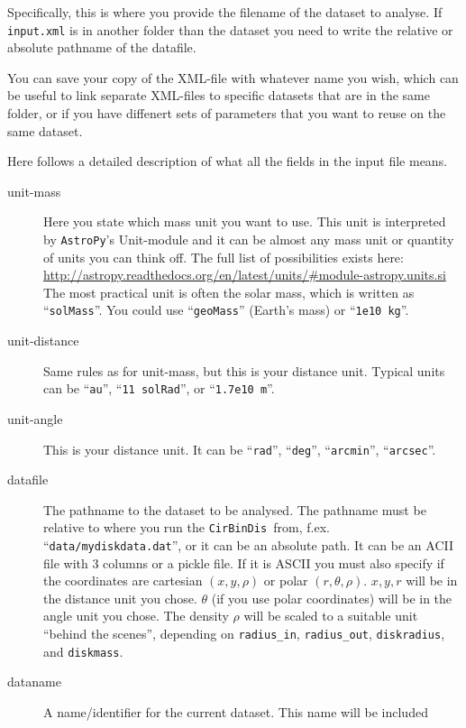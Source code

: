 \documentclass[a4paper, 12pt, english, titlepage]{article}
\newcommand{\sname}{\texttt{CirBinDis }}
\begin{document}
    Specifically, this is where you provide the filename of the dataset to analyse.
    If \texttt{input.xml} is in another folder than the dataset you need to write the relative or absolute pathname of the datafile.

    You can save your copy of the XML-file with whatever name you wish, which can be useful to link separate XML-files to specific datasets that are in the same folder, or if you have diffenert sets of parameters that you want to reuse on the same dataset.

    Here follows a detailed description of what all the fields in the input file means.

    \begin{description}
        \item[unit-mass]
            Here you state which mass unit you want to use. This unit is interpreted by \texttt{AstroPy}'s Unit-module and it can be almost any mass unit or quantity of units you can think off. The full list of possibilities exists here:
            \url{http://astropy.readthedocs.org/en/latest/units/#module-astropy.units.si}
            The most practical unit is often the solar mass, which is written as ``\texttt{solMass}''.
            You could use ``\texttt{geoMass}'' (Earth's mass) or ``\texttt{1e10 kg}''.
        \item[unit-distance]
            Same rules as for unit-mass, but this is your distance unit. Typical units can be ``\texttt{au}'', ``\texttt{11 solRad}'', or ``\texttt{1.7e10 m}''.
        \item[unit-angle]
            This is your distance unit. It can be ``\texttt{rad}'', ``\texttt{deg}'', ``\texttt{arcmin}'', ``\texttt{arcsec}''.
        \item[datafile]
            The pathname to the dataset to be analysed. The pathname must be relative to where you run the \sname from, f.ex. ``\texttt{data/mydiskdata.dat}'', or it can be an absolute path. It can be an ACII file with 3 columns or a pickle file. If it is ASCII you must also specify if the coordinates are cartesian $(x,y,\rho)$ or polar $(r,\theta,\rho)$. $x,y,r$ will be in the distance unit you chose. $\theta$ (if you use polar coordinates) will be in the angle unit you chose. The density $\rho$ will be scaled to a suitable unit ``behind the scenes'', depending on \texttt{radius\_in}, \texttt{radius\_out}, \texttt{diskradius}, and \texttt{diskmass}.
        \item[dataname]
            A name/identifier for the current dataset. This name will be included

\end{description}
\end{document}
